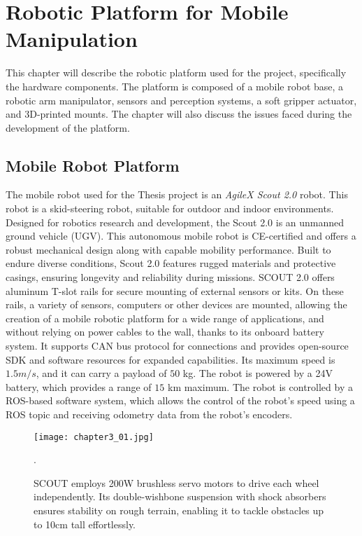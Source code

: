 
\chapter{Robotic Platform for Mobile Manipulation}

This chapter will describe the robotic platform used for the project, specifically the hardware components.
The platform is composed of a mobile robot base, a robotic arm manipulator, sensors and perception systems, 
a soft gripper actuator, and 3D-printed mounts.
The chapter will also discuss the issues faced during the development of the platform.

\section{Mobile Robot Platform}

The mobile robot used for the Thesis project is an \textit{AgileX Scout 2.0} robot. 
This robot is a skid-steering robot, suitable for outdoor and indoor environments. 
Designed for robotics research and development, the Scout 2.0 is an unmanned ground vehicle (UGV). 
This autonomous mobile robot is CE-certified and offers a robust mechanical design along with capable mobility performance. 
Built to endure diverse conditions, Scout 2.0 features rugged materials and protective casings, ensuring longevity
and reliability during missions. SCOUT 2.0 offers aluminum T-slot rails for secure mounting of external sensors or kits. 
On these rails, a variety of sensors, computers or other devices are mounted, allowing the creation of a mobile robotic platform
for a wide range of applications, and without relying on power cables to the wall, thanks to its onboard battery system.
It supports CAN bus protocol for connections and provides open-source SDK and software resources for expanded capabilities.
Its maximum speed is $1.5 m/s$, and it can carry a payload of $50$ kg. 
The robot is powered by a 24V battery, which provides a range of $15$ km maximum. 
The robot is controlled by a ROS-based software system, which allows the control of the robot's speed using a ROS topic
and receiving odometry data from the robot's encoders.

\begin{figure}[ht]
	\centering
	\texttt{[image: chapter3\_01.jpg]}
	\captionsetup{width=1\linewidth}
	\caption{SCOUT employs 200W brushless servo motors to drive each wheel independently. 
    Its double-wishbone suspension with shock absorbers ensures stability on rough terrain, 
    enabling it to tackle obstacles up to 10cm tall effortlessly.}.
	\label{fig:c3_img01}
\end{figure}

